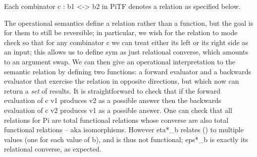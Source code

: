 \documentclass{llncs}
\begin{document}
\begin{definition}
\label{def:relational-PiTF}
Each combinator {{c : b1 <-> b2}} in {{PiTF}} denotes a relation
as specified below. 
%
%
%
%
%
%
%
%
%
%
%
%
\end{definition}

The operational semantics define a relation rather than a function, but the
goal is for them to still be reversible; in particular, we wish for the
relation to mode check so that for any combinator {{c}} we can treat either
its left or its right side as an input; this allows us to define {{sym}} as
just relational converse, which amounts to
an argument swap. We can then give an operational interpretation to the
semantic relation by defining two functions: a forward evaluator and a
backwards evaluator that exercise the relation in opposite directions,
but which now can return a \emph{set} of results. It is
straightforward to check that if the forward evaluation of {{c v1}} produces
{{v2}} as a possible answer then the backwards evaluation of {{c v2}}
produces {{v1}} as a possible answer.  One can check that all relations
for {{Pi}} are total functional relations whose converse are also total 
functional relations -- aka isomorphisms.  However {{eta*_b}} relates
{{()}} to multiple values (one for each value of {{b}}), and is thus
not functional; {{eps*_b}} is exactly its relational converse, as expected.
\end{document}
